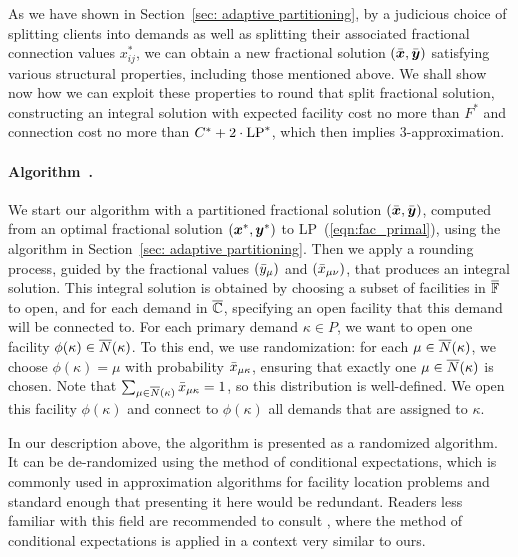 \documentclass[11pt]{article}
\begin{document}
As we have shown in Section~{\ref{sec: adaptive partitioning}},
by a judicious choice of splitting clients into demands as
well as splitting their associated fractional connection
values $x_{ij}^\ast$, we can obtain a new fractional solution
$(\bar{\boldsymbol{x}},\bar{\boldsymbol{y}})$ satisfying various structural properties, including
those mentioned above. We shall
show now how we can exploit these properties to round that split fractional
solution, constructing an integral solution with expected
facility cost no more than $F^\ast$ and connection cost no
more than $C^\ast+2\cdot\mbox{\rm LP}^\ast$, which then implies
$3$-approximation. 


\paragraph{Algorithm~{\EGUP.}}
We start our algorithm with a partitioned fractional
solution $(\bar{\boldsymbol{x}},\bar{\boldsymbol{y}})$, computed from an optimal
fractional solution $(\boldsymbol{x}^\ast, \boldsymbol{y}^\ast)$ to
LP~(\ref{eqn:fac_primal}), using the algorithm in
Section~\ref{sec: adaptive partitioning}. Then we apply a
rounding process, guided by the fractional values
$({\bar y}_{\mu})$ and $({\bar x}_{\mu\nu})$, that produces an
integral solution. This integral solution is obtained by
choosing a subset of facilities in $\overline{\mathbb{F}}$ to open,
and for each demand in $\overline{\mathbb{C}}$, specifying an open
facility that this demand will be connected to.  For each
primary demand $\kappa\in P$, we want to open one facility
$\phi(\kappa) \in {\overline{N}}(\kappa)$. To this end, we use
randomization: for each $\mu\in{\overline{N}}(\kappa)$, we choose
$\phi(\kappa) = \mu$ with probability ${\bar x}_{\mu\kappa}$,
ensuring that exactly one $\mu \in {\overline{N}}(\kappa)$ is
chosen. Note that
$\sum_{\mu\in{\overline{N}}(\kappa)}{\bar x}_{\mu\kappa}=1$, so this distribution
is well-defined.  We open
this facility $\phi(\kappa)$ and connect to $\phi(\kappa)$
all demands that are assigned to $\kappa$.  

In our description above, the algorithm is presented as a randomized
algorithm. It can be de-randomized using the method of conditional
expectations, which is commonly used in approximation algorithms
for facility location problems and standard enough that presenting
it here would be redundant. Readers less familiar with this field
are recommended to consult \cite{ChudakS04}, where the method of
conditional expectations is applied in a context very similar to ours.

\end{document}
